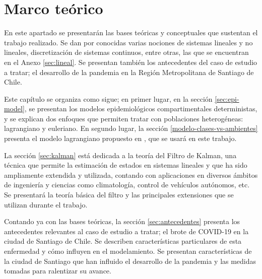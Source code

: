 \chapter{Marco teórico}\label{chap:marco}



En este apartado se presentarán las bases teóricas y conceptuales que sustentan el trabajo realizado. Se dan por conocidas varias nociones de sistemas lineales y no lineales, discretización de sistemas continuos, entre otras, las que se encuentran en el Anexo \ref{sec:lineal}. Se presentan también los antecedentes del caso de estudio a tratar; el desarrollo de la pandemia en la Región Metropolitana de Santiago de Chile.

Este capítulo se organiza como sigue; en primer lugar, en la sección \ref{sec:epi-model}, se presentan los modelos epidemiológicos compartimentales deterministas, y se explican dos enfoques que permiten tratar con poblaciones heterogéneas: lagrangiano y euleriano. En segundo lugar, la sección \ref{modelo-clases-vs-ambientes} presenta el modelo lagrangiano propuesto en \cite{Bichara2018}, que se usará en este trabajo.


La sección \ref{sec:kalman} está dedicada a la teoría del Filtro de Kalman, una técnica que permite la estimación de estados en sistemas lineales y que ha sido ampliamente extendida y utilizada, contando con aplicaciones en diversos ámbitos de ingeniería y ciencias como climatología, control de vehículos autónomos, etc. Se presentará la teoría básica del filtro y las principales extensiones que se utilizan durante el trabajo.

Contando ya con las bases teóricas, la sección \ref{sec:antecedentes} presenta los antecedentes relevantes al caso de estudio a tratar; el brote de COVID-19 en la ciudad de Santiago de Chile. Se describen características particulares de esta enfermedad y cómo influyen en el modelamiento. Se presentan características de la ciudad de Santiago que han influido el desarrollo de la pandemia y las medidas tomadas para ralentizar su avance.


